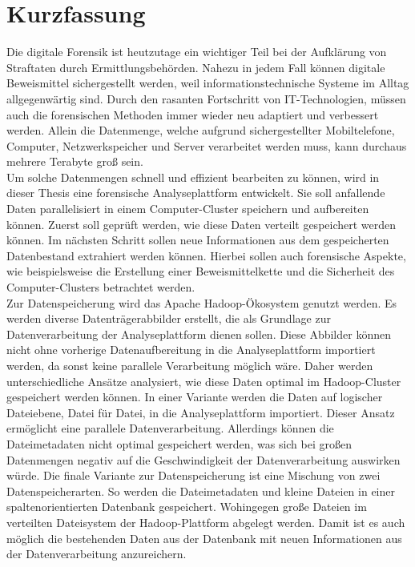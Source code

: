 %
\section*{Kurzfassung}
Die digitale Forensik ist heutzutage ein wichtiger Teil bei der Aufklärung von Straftaten durch Ermittlungsbehörden. Nahezu in jedem Fall können digitale Beweismittel sichergestellt werden, weil informationstechnische Systeme im Alltag allgegenwärtig sind. Durch den rasanten Fortschritt von IT-Technologien, müssen auch die forensischen Methoden immer wieder neu adaptiert und verbessert werden. Allein die Datenmenge, welche aufgrund sichergestellter Mobiltelefone, Computer, Netzwerkspeicher und Server verarbeitet werden muss, kann durchaus mehrere Terabyte groß sein.\\
Um solche Datenmengen schnell und effizient bearbeiten zu können, wird in dieser Thesis eine forensische Analyseplattform entwickelt. Sie soll anfallende Daten parallelisiert in einem Computer-Cluster speichern und aufbereiten können. Zuerst soll geprüft werden, wie diese Daten verteilt gespeichert werden können. Im nächsten Schritt sollen neue Informationen aus dem gespeicherten Datenbestand extrahiert werden können. Hierbei sollen auch forensische Aspekte, wie beispielsweise die Erstellung einer Beweismittelkette und die Sicherheit des Computer-Clusters betrachtet werden.\\

\noindent
Zur Datenspeicherung wird das Apache Hadoop\textsuperscript{\textregistered}-Ökosystem genutzt werden. Es werden diverse Datenträgerabbilder erstellt, die als Grundlage zur Datenverarbeitung der Analyseplattform dienen sollen. Diese Abbilder können nicht ohne vorherige Datenaufbereitung in die Analyseplattform importiert werden, da sonst keine parallele Verarbeitung möglich wäre. Daher werden unterschiedliche Ansätze analysiert, wie diese Daten optimal im Hadoop-Cluster gespeichert werden können. In einer Variante werden die Daten auf logischer Dateiebene, Datei für Datei, in die Analyseplattform importiert. Dieser Ansatz ermöglicht eine parallele Datenverarbeitung. Allerdings können die Dateimetadaten nicht optimal gespeichert werden, was sich bei großen Datenmengen negativ auf die Geschwindigkeit der Datenverarbeitung auswirken würde.
Die finale Variante zur Datenspeicherung ist eine Mischung von zwei Datenspeicherarten. So werden die Dateimetadaten und kleine Dateien in einer spaltenorientierten Datenbank gespeichert. Wohingegen große Dateien im verteilten Dateisystem der Hadoop-Plattform abgelegt werden. Damit ist es auch möglich die bestehenden Daten aus der Datenbank mit neuen Informationen aus der Datenverarbeitung anzureichern.\\

